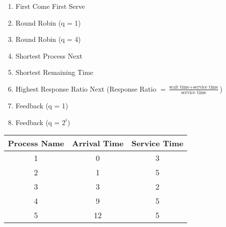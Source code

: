 \documentclass{article}
\begin{document}
\begin{enumerate}
\item First Come First Serve
\item Round Robin (q = 1)
\item Round Robin (q = 4)
\item Shortest Process Next
\item Shortest Remaining Time
\item Highest Response Ratio Next (Response Ratio $= \frac{\text{wait time} + \text{service time}}{\text{service time}}$)
\item Feedback (q = 1)
\item Feedback (q = $2^{i}$)
\end{enumerate}
\begin{center}
\begin{tabular}{|c|c|c|}
\hline
Process Name & Arrival Time & Service Time\\
\hline
1 & 0 & 3\\
\hline
2 & 1 & 5\\
\hline
3 & 3 & 2\\
\hline
4 & 9 & 5\\
\hline
5 & 12 & 5\\
\hline
\end{tabular}

\vspace{1cm}


\end{center}
\end{document}
